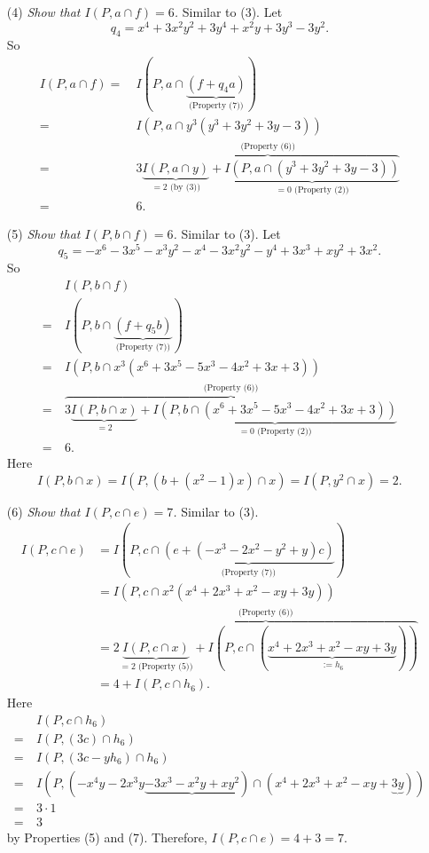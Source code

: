 \documentclass{article}
\begin{document}
\begin{enumerate}
\item[(4)]
  \emph{Show that $I(P, a \cap f) = 6$.}
  Similar to (3).
  Let
  \[
    q_4 = x^4+3x^2y^2+3y^4+x^2y+3y^3-3y^2.
  \]
  So
  \begin{align*}
    I(P, a \cap f)
    =& \: I(P,
      a \cap \underbrace{(f + q_4 a)}_{\text{(Property (7))}}) \\
    =& \: I(P, a \cap y^3(y^3+3y^2+3y-3)) \\
    =& \: \overbrace{3 \underbrace{I(P, a \cap y)}_{= 2 \text{ (by (3))}}
      + \underbrace{I(P, a \cap (y^3+3y^2+3y-3))}_{
        = 0 \text{ (Property (2))}}}^{\text{(Property (6)})} \\
    =& \: 6.
  \end{align*}

\item[(5)]
  \emph{Show that $I(P, b \cap f) = 6$.}
  Similar to (3).
  Let
  \[
    q_5 = -x^6 -3x^5-x^3y^2 -x^4-3x^2y^2-y^4 +3x^3+xy^2 + 3x^2.
  \]
  So
  \begin{align*}
    & \: I(P, b \cap f) \\
    =& \: I(P,
      b \cap \underbrace{(f + q_5 b)}_{\text{(Property (7))}}) \\
    =& \: I(P, b \cap x^3(x^6+3x^5-5x^3-4x^2+3x+3)) \\
    =& \: \overbrace{3 \underbrace{I(P, b \cap x)}_{= 2}
      + \underbrace{I(P, b \cap (x^6+3x^5-5x^3-4x^2+3x+3))}_{
        = 0 \text{ (Property (2))}}}^{\text{(Property (6)})} \\
    =& \: 6.
  \end{align*}
  Here
  \[
    I(P, b \cap x) = I(P, (b + (x^2-1)x) \cap x)= I(P, y^2 \cap x) = 2.
  \]

\item[(6)]
  \emph{Show that $I(P, c \cap e) = 7$.}
  Similar to (3).
  \begin{align*}
    I(P, c \cap e)
    &= I(P, c \cap \underbrace{(e + (-x^3-2x^2-y^2+y)c)}_{\text{(Property (7))}}) \\
    &= I(P, c \cap x^2(x^4 + 2x^3 + x^2 - xy + 3y)) \\
    &= \overbrace{2 \underbrace{I(P, c \cap x)}_{= 2 \text{ (Property (5))}}
      + I(P, c \cap (\underbrace{x^4 + 2x^3 + x^2 - xy + 3y}_{:= h_6}))}^{\text{(Property (6)})} \\
    &= 4 + I(P, c \cap h_6).
  \end{align*}
  Here
  \begin{align*}
    & \: I(P, c \cap h_6) \\
    =& \: I(P, (3c) \cap h_6) \\
    =& \: I(P, (3c - y h_6) \cap h_6) \\
    =& \: I(P, (-x^4y - 2x^3y \underbrace{-3x^3-x^2y+xy^2})
      \cap (x^4 + 2x^3 + x^2 - xy + \underbrace{3y})) \\
    =& \: 3 \cdot 1 \\
    =& \: 3
  \end{align*}
  by Properties (5) and (7).
  Therefore, $I(P, c \cap e) = 4 + 3 = 7$.


\end{enumerate}
\end{document}
